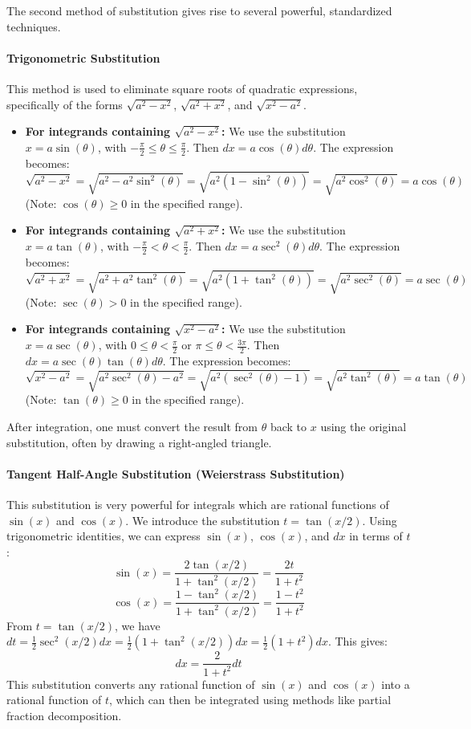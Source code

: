 The second method of substitution gives rise to several powerful, standardized techniques.

\paragraph{Trigonometric Substitution}
This method is used to eliminate square roots of quadratic expressions, specifically of the forms $\sqrt{a^2 - x^2}$, $\sqrt{a^2 + x^2}$, and $\sqrt{x^2 - a^2}$.

\begin{itemize}
    \item \textbf{For integrands containing $\sqrt{a^2 - x^2}$:}
    We use the substitution $x = a \sin(\theta)$, with $-\frac{\pi}{2} \le \theta \le \frac{\pi}{2}$.
    Then $dx = a \cos(\theta) d\theta$.
    The expression becomes:
    \[
    \sqrt{a^2 - x^2} = \sqrt{a^2 - a^2\sin^2(\theta)} = \sqrt{a^2(1 - \sin^2(\theta))} = \sqrt{a^2\cos^2(\theta)} = a \cos(\theta)
    \]
    (Note: $\cos(\theta) \ge 0$ in the specified range).

    \item \textbf{For integrands containing $\sqrt{a^2 + x^2}$:}
    We use the substitution $x = a \tan(\theta)$, with $-\frac{\pi}{2} < \theta < \frac{\pi}{2}$.
    Then $dx = a \sec^2(\theta) d\theta$.
    The expression becomes:
    \[
    \sqrt{a^2 + x^2} = \sqrt{a^2 + a^2\tan^2(\theta)} = \sqrt{a^2(1 + \tan^2(\theta))} = \sqrt{a^2\sec^2(\theta)} = a \sec(\theta)
    \]
    (Note: $\sec(\theta) > 0$ in the specified range).

    \item \textbf{For integrands containing $\sqrt{x^2 - a^2}$:}
    We use the substitution $x = a \sec(\theta)$, with $0 \le \theta < \frac{\pi}{2}$ or $\pi \le \theta < \frac{3\pi}{2}$.
    Then $dx = a \sec(\theta)\tan(\theta) d\theta$.
    The expression becomes:
    \[
    \sqrt{x^2 - a^2} = \sqrt{a^2\sec^2(\theta) - a^2} = \sqrt{a^2(\sec^2(\theta) - 1)} = \sqrt{a^2\tan^2(\theta)} = a \tan(\theta)
    \]
    (Note: $\tan(\theta) \ge 0$ in the specified range).
\end{itemize}
After integration, one must convert the result from $\theta$ back to $x$ using the original substitution, often by drawing a right-angled triangle.

\paragraph{Tangent Half-Angle Substitution (Weierstrass Substitution)}
This substitution is very powerful for integrals which are rational functions of $\sin(x)$ and $\cos(x)$.
We introduce the substitution $t = \tan(x/2)$. Using trigonometric identities, we can express $\sin(x)$, $\cos(x)$, and $dx$ in terms of $t$:
\[
\sin(x) = \frac{2\tan(x/2)}{1+\tan^2(x/2)} = \frac{2t}{1+t^2}
\]
\[
\cos(x) = \frac{1-\tan^2(x/2)}{1+\tan^2(x/2)} = \frac{1-t^2}{1+t^2}
\]
From $t = \tan(x/2)$, we have $dt = \frac{1}{2}\sec^2(x/2) dx = \frac{1}{2}(1 + \tan^2(x/2)) dx = \frac{1}{2}(1+t^2) dx$.
This gives:
\[
dx = \frac{2}{1+t^2} dt
\]
This substitution converts any rational function of $\sin(x)$ and $\cos(x)$ into a rational function of $t$, which can then be integrated using methods like partial fraction decomposition.

